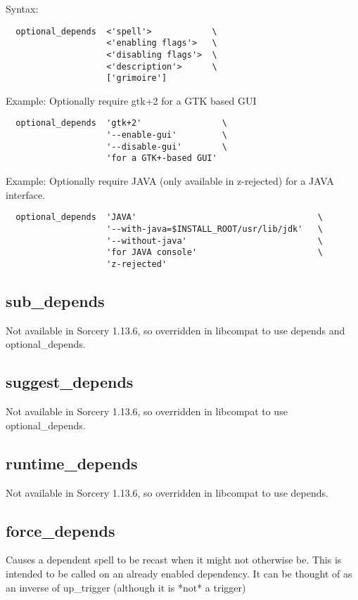 \documentclass[a4paper,10pt]{book}
\begin{document}
Syntax:
\begin{verbatim}
  optional_depends  <'spell'>            \
                    <'enabling flags'>   \
                    <'disabling flags'>  \
                    <'description'>      \
                    ['grimoire']
\end{verbatim}

Example: Optionally require gtk+2 for a GTK based GUI
\begin{verbatim}
  optional_depends  'gtk+2'                \
                    '--enable-gui'         \
                    '--disable-gui'        \
                    'for a GTK+-based GUI'
\end{verbatim}

Example: Optionally require JAVA (only available in z-rejected) for a JAVA
interface.
\begin{verbatim}
  optional_depends  'JAVA'                                    \
                    '--with-java=$INSTALL_ROOT/usr/lib/jdk'   \
                    '--without-java'                          \
                    'for JAVA console'                        \
                    'z-rejected'
\end{verbatim}


\subsection{sub\_depends}
Not available in Sorcery 1.13.6, so overridden in libcompat to use depends and
optional\_depends.

\subsection{suggest\_depends}
Not available in Sorcery 1.13.6, so overridden in libcompat to use
optional\_depends.

\subsection{runtime\_depends}
Not available in Sorcery 1.13.6, so overridden in libcompat to use
depends.

\subsection{force\_depends}
Causes a dependent spell to be recast when it might not otherwise be. This is
intended to be called on an already enabled dependency. It can be thought of
as an inverse of up\_trigger (although it is *not* a trigger)
\end{document}
